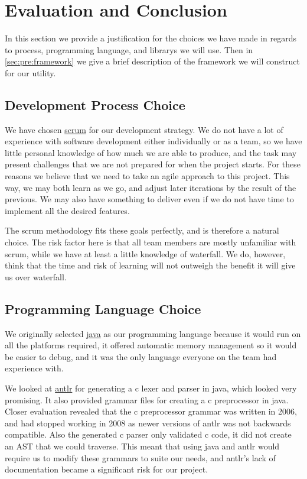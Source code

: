 \section{Evaluation and Conclusion}
\label{sec:pre:eval}
In this section we provide a justification for the choices we have made in
regards to process, programming language, and \glspl{library} we will use. Then
in \autoref{sec:pre:framework} we give a brief description of the framework
we will construct for our \gls{utility}.

\subsection{Development Process Choice}
\label{sec:pre:devchoice}
We have chosen \hyperref[sec:pre:scrum]{\Gls{scrum}} for our development strategy.
We do not have a lot of experience with software development either
individually or as a team, so we have little personal knowledge of how much
we are able to produce, and the task may present challenges that we are not
prepared for when the project starts. For these reasons we believe that we
need to take an agile approach to this project. This way, we may both learn as
we go, and adjust later iterations by the result of the previous. We may also
have something to deliver even if we do not have time to implement all the
desired features.

The \Gls{scrum} methodology fits these goals perfectly, and is therefore a natural
choice. The risk factor here is that all team members are mostly unfamiliar
with \Gls{scrum}, while we have at least a little knowledge of waterfall. We do,
however, think that the time and risk of learning will not outweigh
the benefit it will give us over waterfall.

\subsection{Programming Language Choice}
\label{sec:pre:langchoice}
We originally selected \hyperref[sec:pre:java]{\Gls{java}} as our programming
language because it would run on all the platforms required, it offered
automatic memory management so it would be easier to debug, and it was the only
language everyone on the team had experience with.

We looked at \hyperref[sec:pre:antlr]{\gls{antlr}} for generating a
\Gls{c} \gls{lexer} and \gls{parser} in \Gls{java}, which looked very promising. It also provided
grammar files for creating a \Gls{c} \gls{preprocessor} in \Gls{java}. Closer evaluation revealed
that the \Gls{c} \gls{preprocessor} grammar was written in 2006, and had stopped working in
2008 as newer versions of \gls{antlr} was not backwards compatible. Also the
generated \Gls{c} \gls{parser} only validated \Gls{c} code, it did not create an \gls{AST} that we could traverse.
This meant that using \Gls{java} and \gls{antlr} would
require us to modify these grammars to suite our needs, and \gls{antlr}'s lack of
documentation became a significant risk for our project.

